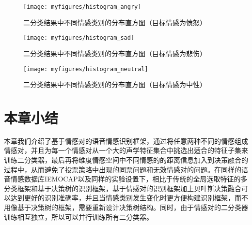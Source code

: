 \begin{figure}[!h] %
    \vspace{-0.5cm}  %
    \setlength{\belowcaptionskip}{0cm}   %
    \centering
    \texttt{[image: myfigures/histogram\_angry]}
    \caption{二分类结果中不同情感类别的分布直方图（目标情感为愤怒）}
    \label{fig:histogram_angry}
\end{figure}

\begin{figure}[!h] %
    \vspace{-2cm}  %
    \setlength{\belowcaptionskip}{0cm}   %
    \centering
    \texttt{[image: myfigures/histogram\_sad]}
    \caption{二分类结果中不同情感类别的分布直方图（目标情感为悲伤）}
    \label{fig:histogram_sad}
\end{figure}

\begin{figure}[!h] %
    \vspace{-4.5cm}  %
    \setlength{\belowcaptionskip}{-0cm}   %
    \centering
    \texttt{[image: myfigures/histogram\_neutral]}
    \caption{二分类结果中不同情感类别的分布直方图（目标情感为中性）}
    \label{fig:histogram_neutral}
\end{figure}

\section{本章小结}
\label{sec:emo_pair_summary}

本章我们介绍了基于情感对的语音情感识别框架，通过将任意两种不同的情感组成情感对，并且为每一个情感对从一个大的声学特征集合中挑选出适合的特征子集来训练二分类器，最后再将维度情感空间中不同情感的的距离信息加入到决策融合的过程中，从而避免了投票策略中出现的同票问题和无效情感对的问题。在同样的语音情感数据库IEMOCAP以及同样的实验设置下，相比于传统的全局选取特征的多分类框架和基于决策树的识别框架，基于情感对的识别框架加上贝叶斯决策融合可以达到更好的识别准确率，并且当情感类别发生变化时更方便构建识别框架，而不用像基于决策树的框架，需要重新设计决策树结构。同时，由于情感对的二分类器训练相互独立，所以可以并行训练所有二分类器。
